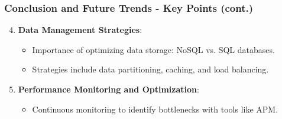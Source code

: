 \documentclass{beamer}
\begin{document}
\begin{frame}[fragile]
    \frametitle{Conclusion and Future Trends - Key Points (cont.)}
    \begin{enumerate}
        \setcounter{enumi}{3} %
        \item \textbf{Data Management Strategies}:
        \begin{itemize}
            \item Importance of optimizing data storage: NoSQL vs. SQL databases.
            \item Strategies include data partitioning, caching, and load balancing.
        \end{itemize}

        \item \textbf{Performance Monitoring and Optimization}:
        \begin{itemize}
            \item Continuous monitoring to identify bottlenecks with tools like APM.
        \end{itemize}
    \end{enumerate}
\end{frame}
\end{document}
